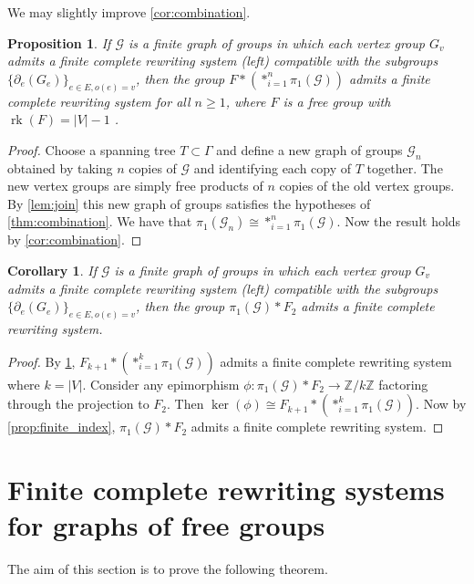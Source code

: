 \documentclass[12pt, a4paper]{amsart}
\newtheorem{corollary}[theorem]{Corollary}
\newtheorem{proposition}[theorem]{Proposition}
\theoremstyle{definition}
\newcommand{\Z}{\mathbb{Z}}
\DeclareMathOperator{\rk}{rk}
\begin{document}
We may slightly improve \cref{cor:combination}.

\begin{proposition}
\label{prop:producting}
If $\mathcal{G}$ is a finite graph of groups in which each vertex group $G_v$ admits a finite complete rewriting system (left) compatible with the subgroups $\{\partial_e(G_e)\}_{e\in E, o(e) = v}$, then the group $F*(*_{i=1}^n\pi_1(\mathcal{G}))$ admits a finite complete rewriting system for all $n\geqslant 1$, where $F$ is a free group with $\rk(F) = |V| - 1$ .
\end{proposition}

\begin{proof}
Choose a spanning tree $T\subset \Gamma$ and define a new graph of groups $\mathcal{G}_n$ obtained by taking $n$ copies of $\mathcal{G}$ and identifying each copy of $T$ together. The new vertex groups are simply free products of $n$ copies of the old vertex groups. By \cref{lem:join} this new graph of groups satisfies the hypotheses of \cref{thm:combination}. We have that $\pi_1(\mathcal{G}_n) \cong *_{i=1}^n\pi_1(\mathcal{G})$. Now the result holds by \cref{cor:combination}.
\end{proof}

\begin{corollary}
\label{cor:combination2}
If $\mathcal{G}$ is a finite graph of groups in which each vertex group $G_v$ admits a finite complete rewriting system (left) compatible with the subgroups $\{\partial_e(G_e)\}_{e\in E, o(e) = v}$, then the group $\pi_1(\mathcal{G})*F_2$ admits a finite complete rewriting system.
\end{corollary}

\begin{proof}
By \cref{prop:producting}, $F_{k+1}*(*_{i=1}^k\pi_1(\mathcal{G}))$ admits a finite complete rewriting system where $k = |V|$. Consider any epimorphism $\phi\colon \pi_1(\mathcal{G})*F_2\to \Z/k\Z$ factoring through the projection to $F_2$. Then $\ker(\phi) \cong F_{k+1}*(*_{i=1}^k\pi_1(\mathcal{G}))$. Now by \cref{prop:finite_index}, $\pi_1(\mathcal{G})*F_2$ admits a finite complete rewriting system.
\end{proof}


\section{Finite complete rewriting systems for graphs of free groups}


The aim of this section is to prove the following theorem.
\end{document}
